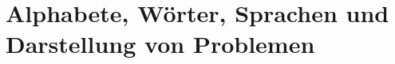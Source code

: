 \documentclass{article}
\begin{document}
\startDocument
\usetcolorboxes

\newpage


\newpage





\newsection
\section{Alphabete, Wörter, Sprachen und Darstellung von Problemen}


\end{document}
